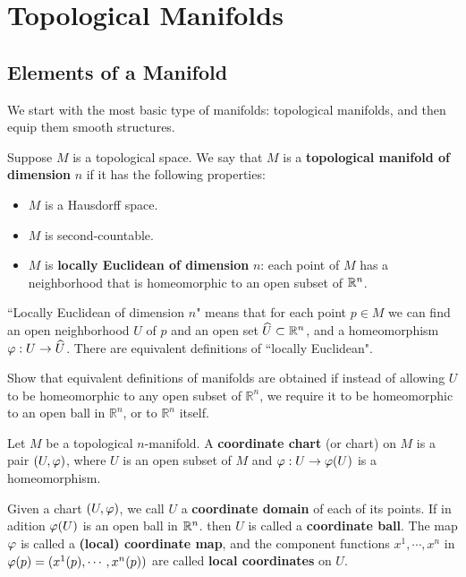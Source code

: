 \section{Topological Manifolds}
\subsection{Elements of a Manifold}
We start with the most basic type of manifolds: topological manifolds, and then equip them smooth structures.
\begin{definition}
    Suppose $M$ is a topological space. We say that $M$ is a \textbf{topological manifold of dimension} $n$ if it has the following properties:
    \begin{itemize}
    \item $M$ is a Hausdorff space.
    \item $M$ is second-countable.
    \item $M$ is \textbf{locally Euclidean of dimension }$n$: 
    each point of $M$ has a neighborhood that is homeomorphic to an open subset of $\mathbb{R}^n$. 
    \end{itemize}
\end{definition}
``Locally Euclidean of dimension $n$" means that for each point $p \in M$ we can find an open neighborhood $U$ of $p$ and an open set $\widehat{U} \subset \mathbb{R}^n$, and a homeomorphism $\varphi: U \to \widehat{U}$. There are equivalent definitions of ``locally Euclidean".
\begin{exercise}
    Show that equivalent definitions of manifolds are obtained if instead of allowing $U$ to be homeomorphic to any open subset of $\mathbb{R}^n$, we require it to be homeomorphic to an open ball in $\mathbb{R}^n$, or to $\mathbb{R}^n$ itself. 
\end{exercise}

\begin{definition}[chart]
    Let $M$ be a topological $n$-manifold. A \textbf{coordinate chart} (or chart) on $M$ is a pair $(U, \varphi)$, where $U$ is an open subset of $M$ and $\varphi:U \to \varphi(U)$ is a homeomorphism.
\end{definition}
Given a chart $(U,\varphi)$, we call $U$ a \textbf{coordinate domain} of each of its points. If in adition $\varphi(U)$ is an open ball in $\mathbb{R}^n$. then $U$ is called a \textbf{coordinate ball}. The map $\varphi$ is called a \textbf{(local) coordinate map}, and the component functions $x^1, \cdots, x^n$ in $\varphi(p) = (x^1(p), \cdots, x^n(p))$ are called \textbf{local coordinates} on $U$. 

